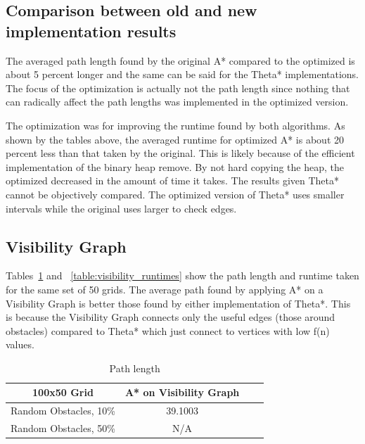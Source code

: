 \documentclass[a4paper,11pt]{report}
\begin{document}
\subsection{Comparison between old and new implementation results}
The averaged path length found by the original A* compared to the optimized is about 5 percent longer and the same can be said for the Theta* implementations. The focus of the optimization is actually not the path length since nothing that can radically affect the path lengths was implemented in the optimized version. 

The optimization was for improving the runtime found by both algorithms. As shown by the tables above, the averaged runtime for optimized A* is about 20 percent less than that taken by the original. This is likely because of the efficient implementation of the binary heap remove. By not hard copying the heap, the optimized decreased in the amount of time it takes. 
The results given Theta* cannot be objectively compared. The optimized version of Theta* uses smaller intervals while the original uses larger to check edges.

\subsection{Visibility Graph}
Tables~\ref{table:visibility_path_lengths} and ~\ref{table:visibility_runtimes} show the path length and runtime taken for the same set of 50 grids. The average path found by applying A* on a Visibility Graph is better those found by either implementation of Theta*. This is because the Visibility Graph connects only the useful edges (those around obstacles) compared to Theta* which just connect to vertices with low f(n) values. 


\begin{table}[h!]
   \centering
   \begin{tabular}{ | c | c |c |c | }

      \hline
      \textbf{100x50 Grid} & \textbf{A* on Visibility Graph}  \\ \hline
      Random Obstacles, 10\% & 39.1003 \\ \hline
      Random Obstacles, 50\% & N/A  \\ \hline

   \end{tabular}

   \caption{Path length}
   \label{table:visibility_path_lengths}
\end{table}
\end{document}
